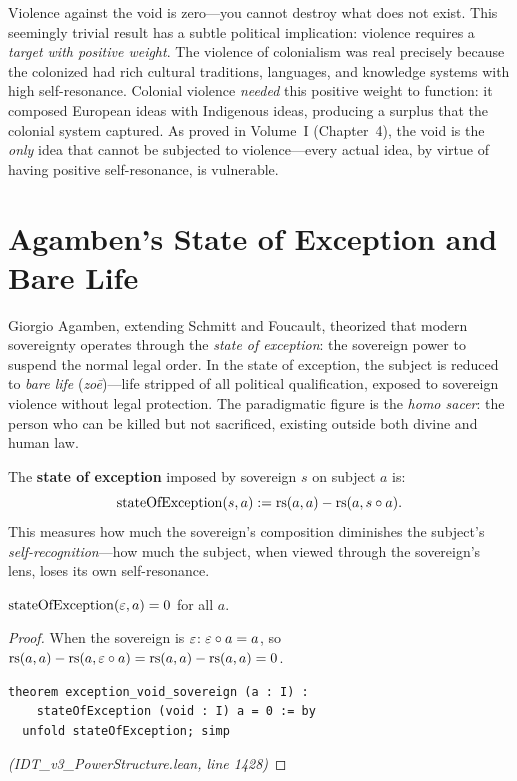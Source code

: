 \begin{interpretation}
Violence against the void is zero---you cannot destroy what does not exist.
This seemingly trivial result has a subtle political implication: violence
requires a \emph{target with positive weight}. The violence of colonialism was
real precisely because the colonized had rich cultural traditions, languages,
and knowledge systems with high self-resonance. Colonial violence \emph{needed}
this positive weight to function: it composed European ideas with Indigenous
ideas, producing a surplus that the colonial system captured. As proved in
Volume~I (Chapter~4), the void is the \emph{only} idea that cannot be subjected
to violence---every actual idea, by virtue of having positive self-resonance,
is vulnerable.
\end{interpretation}

\section{Agamben's State of Exception and Bare Life}

Giorgio Agamben, extending Schmitt and Foucault, theorized that modern
sovereignty operates through the \emph{state of exception}: the sovereign
power to suspend the normal legal order. In the state of exception, the
subject is reduced to \emph{bare life} (\emph{zoē})---life stripped of all
political qualification, exposed to sovereign violence without legal protection.
The paradigmatic figure is the \emph{homo sacer}: the person who can be killed
but not sacrificed, existing outside both divine and human law.

\begin{definition}
\label{def:state-of-exception}
The \textbf{state of exception} imposed by sovereign $s$ on subject $a$ is:
\[
  \mathrm{stateOfException}(s, a) := \mathrm{rs}(a, a) - \mathrm{rs}(a, s \circ a).
\]
This measures how much the sovereign's composition diminishes the subject's
\emph{self-recognition}---how much the subject, when viewed through the
sovereign's lens, loses its own self-resonance.
\end{definition}

\begin{theorem}
\label{thm:exception-void-sovereign}
$\mathrm{stateOfException}(\varepsilon, a) = 0$ for all $a$.
\end{theorem}

\begin{proof}
When the sovereign is $\varepsilon$: $\varepsilon \circ a = a$, so
$\mathrm{rs}(a, a) - \mathrm{rs}(a, \varepsilon \circ a) = \mathrm{rs}(a,a) - \mathrm{rs}(a,a) = 0$.
\begin{lstlisting}
theorem exception_void_sovereign (a : I) :
    stateOfException (void : I) a = 0 := by
  unfold stateOfException; simp
\end{lstlisting}
\textit{(IDT\_v3\_PowerStructure.lean, line 1428)}
\end{proof}

